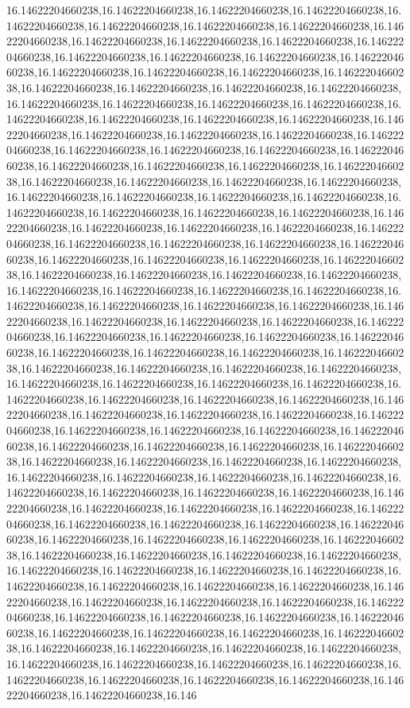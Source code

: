 16.14622204660238,16.14622204660238,16.14622204660238,16.14622204660238,16.14622204660238,16.14622204660238,16.14622204660238,16.14622204660238,16.14622204660238,16.14622204660238,16.14622204660238,16.14622204660238,16.14622204660238,16.14622204660238,16.14622204660238,16.14622204660238,16.14622204660238,16.14622204660238,16.14622204660238,16.14622204660238,16.14622204660238,16.14622204660238,16.14622204660238,16.14622204660238,16.14622204660238,16.14622204660238,16.14622204660238,16.14622204660238,16.14622204660238,16.14622204660238,16.14622204660238,16.14622204660238,16.14622204660238,16.14622204660238,16.14622204660238,16.14622204660238,16.14622204660238,16.14622204660238,16.14622204660238,16.14622204660238,16.14622204660238,16.14622204660238,16.14622204660238,16.14622204660238,16.14622204660238,16.14622204660238,16.14622204660238,16.14622204660238,16.14622204660238,16.14622204660238,16.14622204660238,16.14622204660238,16.14622204660238,16.14622204660238,16.14622204660238,16.14622204660238,16.14622204660238,16.14622204660238,16.14622204660238,16.14622204660238,16.14622204660238,16.14622204660238,16.14622204660238,16.14622204660238,16.14622204660238,16.14622204660238,16.14622204660238,16.14622204660238,16.14622204660238,16.14622204660238,16.14622204660238,16.14622204660238,16.14622204660238,16.14622204660238,16.14622204660238,16.14622204660238,16.14622204660238,16.14622204660238,16.14622204660238,16.14622204660238,16.14622204660238,16.14622204660238,16.14622204660238,16.14622204660238,16.14622204660238,16.14622204660238,16.14622204660238,16.14622204660238,16.14622204660238,16.14622204660238,16.14622204660238,16.14622204660238,16.14622204660238,16.14622204660238,16.14622204660238,16.14622204660238,16.14622204660238,16.14622204660238,16.14622204660238,16.14622204660238,16.14622204660238,16.14622204660238,16.14622204660238,16.14622204660238,16.14622204660238,16.14622204660238,16.14622204660238,16.14622204660238,16.14622204660238,16.14622204660238,16.14622204660238,16.14622204660238,16.14622204660238,16.14622204660238,16.14622204660238,16.14622204660238,16.14622204660238,16.14622204660238,16.14622204660238,16.14622204660238,16.14622204660238,16.14622204660238,16.14622204660238,16.14622204660238,16.14622204660238,16.14622204660238,16.14622204660238,16.14622204660238,16.14622204660238,16.14622204660238,16.14622204660238,16.14622204660238,16.14622204660238,16.14622204660238,16.14622204660238,16.14622204660238,16.14622204660238,16.14622204660238,16.14622204660238,16.14622204660238,16.14622204660238,16.14622204660238,16.14622204660238,16.14622204660238,16.14622204660238,16.14622204660238,16.14622204660238,16.14622204660238,16.14622204660238,16.14622204660238,16.14622204660238,16.14622204660238,16.14622204660238,16.14622204660238,16.14622204660238,16.14622204660238,16.14622204660238,16.14622204660238,16.14622204660238,16.14622204660238,16.14622204660238,16.14622204660238,16.14622204660238,16.14622204660238,16.14622204660238,16.14622204660238,16.14622204660238,16.14622204660238,16.14622204660238,16.14622204660238,16.14622204660238,16.14622204660238,16.14622204660238,16.14622204660238,16.14622204660238,16.14622204660238,16.14622204660238,16.14622204660238,16.14622204660238,16.14622204660238,16.14622204660238,16.14622204660238,16.14622204660238,16.14622204660238,16.14622204660238,16.146